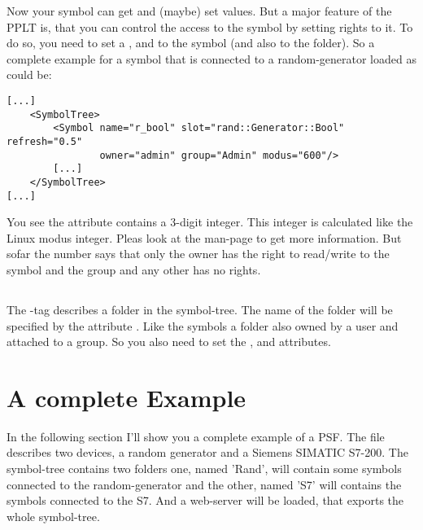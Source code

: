 Now your symbol can get and (maybe) set values. But a major feature of the PPLT is, that you can control the
access to the symbol by setting rights to it. To do so, you need to set a ,  and
 to the symbol (and also to the folder). So a complete example for a symbol that is connected to
a random-generator loaded as  could be:
\begin{verbatim}
[...]
    <SymbolTree>
        <Symbol name="r_bool" slot="rand::Generator::Bool" refresh="0.5" 
                owner="admin" group="Admin" modus="600"/>
        [...]
    </SymbolTree>
[...]
\end{verbatim}
You see the attribute  contains a 3-digit integer. This integer is calculated like the Linux modus integer. Pleas look
at the  man-page to get more information. But sofar the number  says that only the owner has the right to 
read/write to the symbol and the group and any other has no rights.


\subsection{}
The -tag describes a folder in the symbol-tree. The name of the folder will be specified by the
attribute . Like the symbols a folder also owned by a user and attached to a group. So you also need 
to set the ,  and  attributes. 

\newpage
\section{A complete Example}
In the following section I'll show you a complete example of a PSF. The file describes two devices, a random generator and
a Siemens SIMATIC S7-200. The symbol-tree contains two folders one, named 'Rand', will contain some symbols connected
to the random-generator and the other, named 'S7' will contains the symbols connected to the S7. And a web-server will be loaded, 
that exports the whole symbol-tree. 




